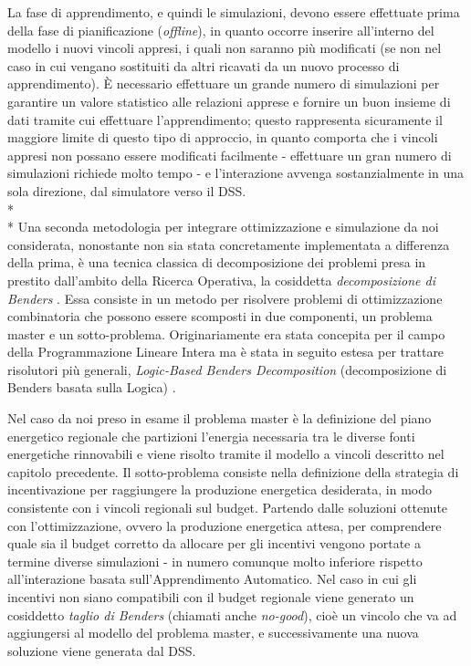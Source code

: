 La fase di apprendimento, e quindi le simulazioni, devono essere effettuate prima della fase di pianificazione (\emph{offline}), in quanto occorre inserire all'interno del modello i nuovi vincoli appresi, i quali non saranno più modificati (se non nel caso in cui vengano sostituiti da altri ricavati da un nuovo processo di apprendimento). \`E necessario effettuare un grande numero di simulazioni per garantire un valore statistico alle relazioni apprese e fornire un buon insieme di dati tramite cui effettuare l'apprendimento; questo rappresenta sicuramente il maggiore limite di questo tipo di approccio, in quanto comporta che i vincoli appresi non possano essere modificati facilmente - effettuare un gran numero di simulazioni richiede molto tempo - e l'interazione avvenga sostanzialmente in una sola direzione, dal simulatore verso il DSS. 
\\*\\*
Una seconda metodologia per integrare ottimizzazione e simulazione da noi considerata, nonostante non sia stata concretamente implementata a differenza della prima, è una tecnica classica di decomposizione dei problemi presa in prestito dall'ambito della Ricerca Operativa, la cosiddetta \emph{decomposizione di Benders} \cite{bendersDec}. Essa consiste in un metodo per risolvere problemi di ottimizzazione combinatoria che possono essere scomposti in due componenti, un problema master e un sotto-problema. Originariamente era stata concepita per il campo della Programmazione Lineare Intera ma è stata in seguito estesa per trattare risolutori più generali, \emph{Logic-Based Benders Decomposition} (decomposizione di Benders basata sulla Logica) \cite{Hooker95logic-basedbenders}. 

Nel caso da noi preso in esame il problema master è la definizione del piano energetico regionale che partizioni l'energia necessaria tra le diverse fonti energetiche rinnovabili e viene risolto tramite il modello a vincoli descritto nel capitolo precedente. Il sotto-problema consiste nella definizione della strategia di incentivazione per raggiungere la produzione energetica desiderata, in modo consistente con i vincoli regionali sul budget. Partendo dalle soluzioni ottenute con l'ottimizzazione, ovvero la produzione energetica attesa, per comprendere quale sia il budget corretto da allocare per gli incentivi vengono portate a termine diverse simulazioni - in numero comunque molto inferiore rispetto all'interazione basata sull'Apprendimento Automatico. Nel caso in cui gli incentivi non siano compatibili con il budget regionale viene generato un cosiddetto \emph{taglio di Benders} (chiamati anche \emph{no-good}), cioè un vincolo che va ad aggiungersi al modello del problema master, e successivamente una nuova soluzione viene generata dal DSS. 

